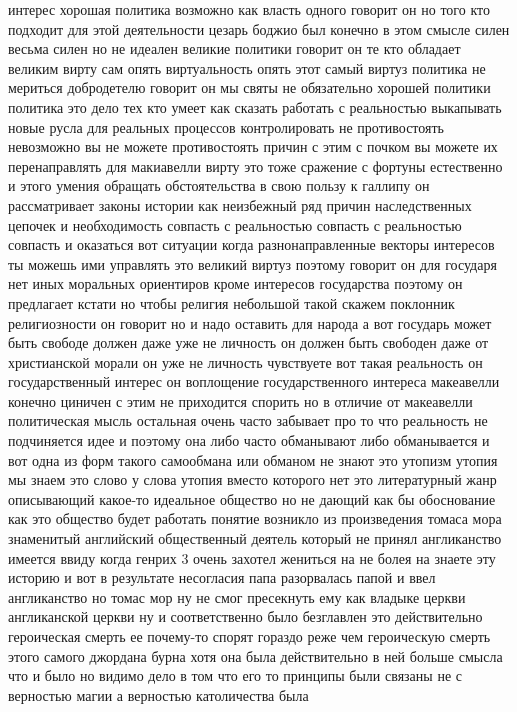 интерес хорошая политика возможно как власть одного говорит он но того кто
подходит для этой деятельности цезарь боджио был конечно в этом смысле силен
весьма силен но не идеален великие политики говорит он те кто обладает великим
вирту сам опять виртуальность опять этот самый виртуз политика не мериться
добродетелю говорит он мы святы не обязательно хорошей политики политика это
дело тех кто умеет как сказать работать с реальностью выкапывать новые русла для
реальных процессов контролировать не противостоять невозможно вы не можете
противостоять причин с этим с почком вы можете их перенаправлять для макиавелли
вирту это тоже сражение с фортуны естественно и этого умения обращать
обстоятельства в свою пользу к галлипу он рассматривает законы истории как
неизбежный ряд причин наследственных цепочек и необходимость совпасть с
реальностью совпасть с реальностью совпасть и оказаться вот ситуации когда
разнонаправленные векторы интересов ты можешь ими управлять это великий виртуз
поэтому говорит он для государя нет иных моральных ориентиров кроме интересов
государства поэтому он предлагает кстати но чтобы религия небольшой такой скажем
поклонник религиозности он говорит но и надо оставить для народа а вот государь
может быть свободе должен даже уже не личность он должен быть свободен даже от
христианской морали он уже не личность чувствуете вот такая реальность он
государственный интерес он воплощение государственного интереса макеавелли
конечно циничен с этим не приходится спорить но в отличие от макеавелли
политическая мысль остальная очень часто забывает про то что реальность не
подчиняется идее и поэтому она либо часто обманывают либо обманывается и вот
одна из форм такого самообмана или обманом не знают это утопизм утопия мы знаем
это слово у слова утопия вместо которого нет это литературный жанр описывающий
какое-то идеальное общество но не дающий как бы обоснование как это общество
будет работать понятие возникло из произведения томаса мора знаменитый
английский общественный деятель который не принял англиканство имеется ввиду
когда генрих 3 очень захотел жениться на не болея на знаете эту историю и вот в
результате несогласия папа разорвалась папой и ввел англиканство но томас мор ну
не смог пресекнуть ему как владыке церкви англиканской церкви ну и
соответственно было безглавлен это действительно героическая смерть ее почему-то
спорят гораздо реже чем героическую смерть этого самого джордана бурна хотя она
была действительно в ней больше смысла что и было но видимо дело в том что его
то принципы были связаны не с верностью магии а верностью католичества была
